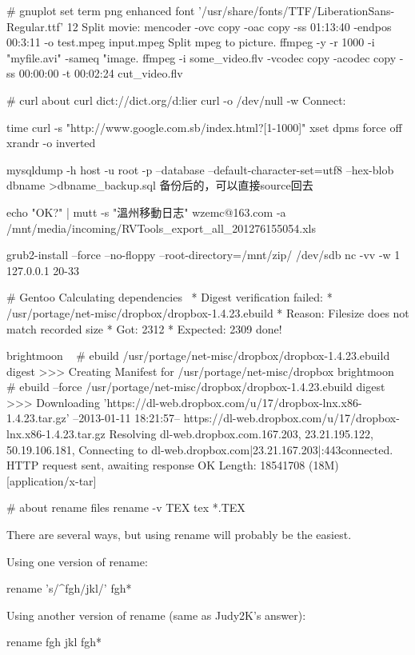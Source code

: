 {# gnuplot
set term png enhanced font '/usr/share/fonts/TTF/LiberationSans-Regular.ttf' 12
Split movie:
mencoder -ovc copy -oac copy -ss 01:13:40 -endpos 00:3:11 -o test.mpeg input.mpeg
Split mpeg to picture.
ffmpeg -y -r 1000 -i "myfile.avi" -sameq "image.%
ffmpeg -i some_video.flv -vcodec copy -acodec copy -ss 00:00:00 -t 00:02:24 cut_video.flv

# curl about
curl dict://dict.org/d:lier
curl -o /dev/null -w Connect: %

time curl -s "http://www.google.com.sb/index.html?[1-1000]"
xset dpms force off
xrandr -o inverted

mysqldump -h host -u root -p --database --default-character-set=utf8 --hex-blob dbname >dbname_backup.sql
备份后的，可以直接source回去 

echo "OK?" | mutt -s "溫州移動日志" wzemc@163.com -a /mnt/media/incoming/RVTools_export_all_201276155054.xls

grub2-install --force --no-floppy --root-directory=/mnt/zip/ /dev/sdb
nc -vv -w 1 127.0.0.1 20-33


# Gentoo
Calculating dependencies \ * Digest verification failed:
 * /usr/portage/net-misc/dropbox/dropbox-1.4.23.ebuild
  * Reason: Filesize does not match recorded size
   * Got: 2312
    * Expected: 2309
    \cdots done!

brightmoon ~ # ebuild /usr/portage/net-misc/dropbox/dropbox-1.4.23.ebuild digest
>>> Creating Manifest for /usr/portage/net-misc/dropbox
brightmoon ~ # ebuild --force /usr/portage/net-misc/dropbox/dropbox-1.4.23.ebuild digest
>>> Downloading 'https://dl-web.dropbox.com/u/17/dropbox-lnx.x86-1.4.23.tar.gz'
--2013-01-11 18:21:57--  https://dl-web.dropbox.com/u/17/dropbox-lnx.x86-1.4.23.tar.gz
Resolving dl-web.dropbox.com.167.203, 23.21.195.122, 50.19.106.181, \cdots
Connecting to dl-web.dropbox.com|23.21.167.203|:443\cdots connected.
HTTP request sent, awaiting response OK
Length: 18541708 (18M) [application/x-tar]

# about rename files
rename -v TEX tex *.TEX

There are several ways, but using rename will probably be the easiest.

Using one version of rename:

rename 's/^fgh/jkl/' fgh*

Using another version of rename (same as Judy2K's answer):

rename fgh jkl fgh*




}
